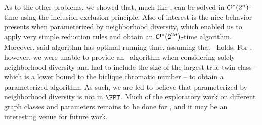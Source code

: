As to the other problems, we showed that, much like ,  can be solved in $\mathcal{O}^*\!\left(2^{n}\right)$-time using the inclusion-exclusion principle.
Also of interest is the nice behavior  presents when parameterized by neighborhood diversity, which enabled us to apply very simple reduction rules and obtain an $\mathcal{O}^*\!\left(2^{2d}\right)$-time \FPT algorithm.
Moreover, said algorithm has optimal running time, assuming that \ETH\ holds.
For , however, we were unable to provide an \FPT\ algorithm when considering solely neighborhood diversity and had to include the size of the largest true twin class -- which is a lower bound to the biclique chromatic number -- to obtain a parameterized algorithm. 
As such, we are led to believe that  parameterized by neighborhood diversity is not in $\FPT$.
Much of the exploratory work on different graph classes and parameters remains to be done for , and it may be an interesting venue for future work.